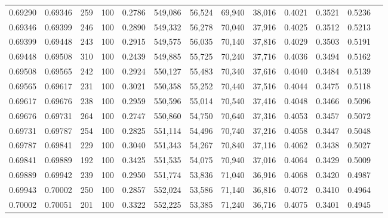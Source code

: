 \begin{tabular}{rrrrrrrrrrrrr}
0.69290 & 0.69346 &   259 & 100 &                                     0.2786 & 549,086 &  56,524 &  69,940 &  38,016 & 0.4021 & 0.3521 & 0.5236 \\
0.69346 & 0.69399 &   246 & 100 &                                     0.2890 & 549,332 &  56,278 &  70,040 &  37,916 & 0.4025 & 0.3512 & 0.5213 \\
0.69399 & 0.69448 &   243 & 100 &                                     0.2915 & 549,575 &  56,035 &  70,140 &  37,816 & 0.4029 & 0.3503 & 0.5191 \\
0.69448 & 0.69508 &   310 & 100 &                                     0.2439 & 549,885 &  55,725 &  70,240 &  37,716 & 0.4036 & 0.3494 & 0.5162 \\
0.69508 & 0.69565 &   242 & 100 &                                     0.2924 & 550,127 &  55,483 &  70,340 &  37,616 & 0.4040 & 0.3484 & 0.5139 \\
0.69565 & 0.69617 &   231 & 100 &                                     0.3021 & 550,358 &  55,252 &  70,440 &  37,516 & 0.4044 & 0.3475 & 0.5118 \\
0.69617 & 0.69676 &   238 & 100 &                                     0.2959 & 550,596 &  55,014 &  70,540 &  37,416 & 0.4048 & 0.3466 & 0.5096 \\
0.69676 & 0.69731 &   264 & 100 &                                     0.2747 & 550,860 &  54,750 &  70,640 &  37,316 & 0.4053 & 0.3457 & 0.5072 \\
0.69731 & 0.69787 &   254 & 100 &                                     0.2825 & 551,114 &  54,496 &  70,740 &  37,216 & 0.4058 & 0.3447 & 0.5048 \\
0.69787 & 0.69841 &   229 & 100 &                                     0.3040 & 551,343 &  54,267 &  70,840 &  37,116 & 0.4062 & 0.3438 & 0.5027 \\
0.69841 & 0.69889 &   192 & 100 &                                     0.3425 & 551,535 &  54,075 &  70,940 &  37,016 & 0.4064 & 0.3429 & 0.5009 \\
0.69889 & 0.69942 &   239 & 100 &                                     0.2950 & 551,774 &  53,836 &  71,040 &  36,916 & 0.4068 & 0.3420 & 0.4987 \\
0.69943 & 0.70002 &   250 & 100 &                                     0.2857 & 552,024 &  53,586 &  71,140 &  36,816 & 0.4072 & 0.3410 & 0.4964 \\
0.70002 & 0.70051 &   201 & 100 &                                     0.3322 & 552,225 &  53,385 &  71,240 &  36,716 & 0.4075 & 0.3401 & 0.4945 \\

\end{tabular}
